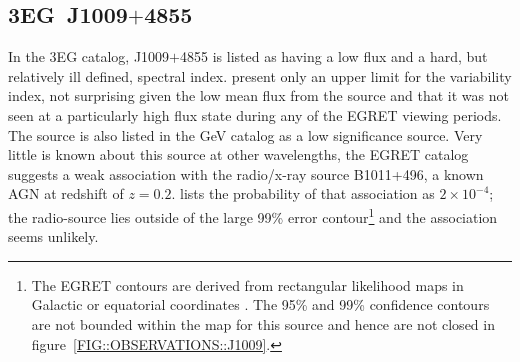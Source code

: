 \subsection{3EG~J1009$+$4855}

In the 3EG catalog, J1009$+$4855 is listed as having a low flux and a
hard, but relatively ill defined, spectral
index. \citet{REF::NOLAN::APJ2003} present only an upper limit for the
variability index, not surprising given the low mean flux from the
source and that it was not seen at a particularly high flux state during
any of the EGRET viewing periods. The source is also listed in the GeV
catalog as a low significance source. Very little is known about this source
at other wavelengths, the EGRET catalog suggests a weak association
with the radio/x-ray source B1011+496, a known AGN at redshift of
$z=0.2$. \citet{REF::MATTOX::APJS2001} lists the probability of that
association as $2\times10^{-4}$; the radio-source lies outside of
the large 99\% error contour\footnote{The EGRET contours are derived
from rectangular likelihood maps in Galactic or equatorial coordinates
\citep[see][]{REF::MATTOX::APJ1996}. The 95\% and 99\% confidence
contours are not bounded within the map for this source and hence are
not closed in figure~\ref{FIG::OBSERVATIONS::J1009}.} and the
association seems unlikely.

